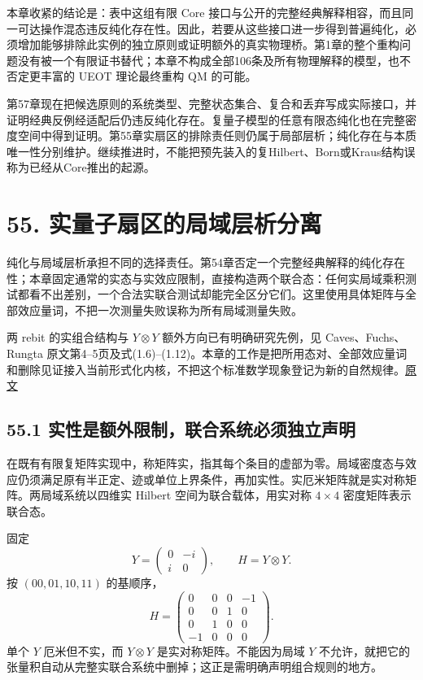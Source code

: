 \documentclass[
  11pt,
  oneside]{book}
\begin{document}
本章收紧的结论是：表中这组有限 Core
接口与公开的完整经典解释相容，而且同一可达操作混态违反纯化存在性。因此，若要从这些接口进一步得到普遍纯化，必须增加能够排除此实例的独立原则或证明额外的真实物理桥。第1章的整个重构问题没有被一个有限证书替代；本章不构成全部106条及所有物理解释的模型，也不否定更丰富的
UEOT 理论最终重构 QM 的可能。

第57章现在把候选原则的系统类型、完整状态集合、复合和丢弃写成实际接口，并证明经典反例经适配后仍违反纯化存在。复量子模型的任意有限态纯化也在完整密度空间中得到证明。第55章实扇区的排除责任则仍属于局部层析；纯化存在与本质唯一性分别维护。继续推进时，不能把预先装入的复Hilbert、Born或Kraus结构误称为已经从Core推出的起源。

\hypertarget{ch-55}{%
\chapter{55. 实量子扇区的局域层析分离}\label{ch-55}}

纯化与局域层析承担不同的选择责任。第54章否定一个完整经典解释的纯化存在性；本章固定通常的实态与实效应限制，直接构造两个联合态：任何实局域乘积测试都看不出差别，一个合法实联合测试却能完全区分它们。这里使用具体矩阵与全部效应量词，不把一次测量失败误称为所有局域测量失败。

两 rebit 的实组合结构与 \(Y\otimes Y\) 额外方向已有明确研究先例，见
Caves、Fuchs、Rungta
原文第4--5页及式(1.6)--(1.12)。本章的工作是把所用态对、全部效应量词和删除见证接入当前形式化内核，不把这个标准数学现象登记为新的自然规律。\href{https://arxiv.org/abs/quant-ph/0009063}{原文}

\hypertarget{ux5b9eux6027ux662fux989dux5916ux9650ux5236ux8054ux5408ux7cfbux7edfux5fc5ux987bux72ecux7acbux58f0ux660e}{%
\section{55.1
实性是额外限制，联合系统必须独立声明}\label{ux5b9eux6027ux662fux989dux5916ux9650ux5236ux8054ux5408ux7cfbux7edfux5fc5ux987bux72ecux7acbux58f0ux660e}}

在既有有限复矩阵实现中，称矩阵实，指其每个条目的虚部为零。局域密度态与效应仍须满足原有半正定、迹或单位上界条件，再加实性。实厄米矩阵就是实对称矩阵。两局域系统以四维实
Hilbert 空间为联合载体，用实对称 \(4\times4\) 密度矩阵表示联合态。

固定 \[
Y=\begin{pmatrix}0&-i\\i&0\end{pmatrix},\qquad H=Y\otimes Y.
\] 按 \((00,01,10,11)\) 的基顺序， \[
H=\begin{pmatrix}
0&0&0&-1\\
0&0&1&0\\
0&1&0&0\\
-1&0&0&0
\end{pmatrix}.
\] 单个 \(Y\) 厄米但不实，而 \(Y\otimes Y\) 是实对称矩阵。不能因为局域
\(Y\)
不允许，就把它的张量积自动从完整实联合系统中删掉；这正是需明确声明组合规则的地方。
\end{document}
